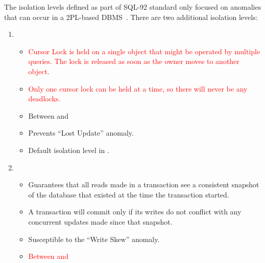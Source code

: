 \documentclass[11pt]{article}
\newcommand{\rr}[1]{\textcolor{red}{#1}}
\begin{document}
The isolation levels defined as part of SQL-92 standard only focused on anomalies that can 
occur in a 2PL-based DBMS~\cite{p1-berenson}. There are two additional isolation levels:
\begin{enumerate}
    \item {}
    \begin{itemize}
        \item \rr{Cursor Lock is held on a single object that might be operated by multiple queries. The lock is released as soon as the owner moves to another object. }
        \item \rr{Only one cursor lock can be held at a time, so there will never be any deadlocks.}
        \item Between  and 
        \item Prevents ``Lost Update'' anomaly.
        \item Default isolation level in .
    \end{itemize}
    
    \item {}
    \begin{itemize}
        \item
        Guarantees that all reads made in a transaction see a consistent snapshot of the 
        database that existed at the time the transaction started.
        
        \item
        A transaction will commit only if its writes do not conflict with any concurrent 
        updates made since that snapshot.
        
        \item
        Susceptible to the ``Write Skew'' anomaly.
        \item \rr{Between  and \isoLevel{READ COMMITTED}}
    \end{itemize}
\end{enumerate}

\newpage


\end{document}
